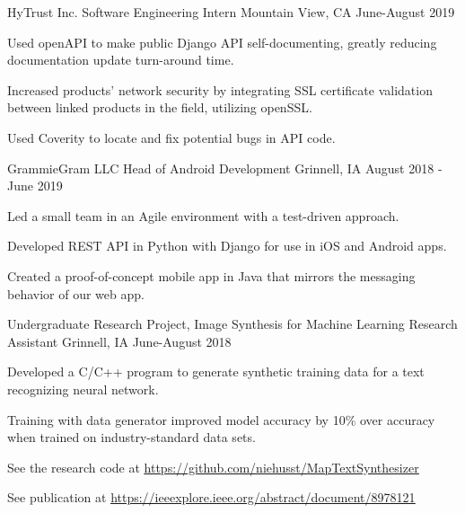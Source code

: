 \documentclass[12pt, a4paper]{awesome-cv}
\begin{document}
\begin{cventries}
  \cventry
    {HyTrust Inc.}
    {Software Engineering Intern}
    {Mountain View, CA}
    {June-August 2019}
    {
      \begin{cvitems}
      	  \item {Used openAPI to make public Django API self-documenting, greatly reducing documentation update turn-around time.}
	      \item {Increased products' network security by integrating SSL certificate validation between linked products in the field, utilizing openSSL.}
	      \item {Used Coverity to locate and fix potential bugs in API code.}
      \end{cvitems}
    }

  \cventry
    {GrammieGram LLC}
    {Head of Android Development}
    {Grinnell, IA}
    {August 2018 - June 2019}
    {
      \begin{cvitems}
        \item {Led a small team in an Agile environment with a test-driven approach.}
      	\item {Developed REST API in Python with Django for use in iOS and Android apps.}
	      \item {Created a proof-of-concept mobile app in Java that mirrors the messaging behavior of our web app.}
      \end{cvitems}
    }


  \cventry
    {Undergraduate Research Project, Image Synthesis for Machine Learning}
    {Research Assistant}
    {Grinnell, IA}
    {June-August 2018}
    {
      \begin{cvitems}
        \item{Developed a C/C++ program to generate synthetic training data for a text recognizing neural network.}
        \item{Training with data generator improved model accuracy by 10\% over accuracy when trained on industry-standard data sets.}
	    \item{See the research code at \underline{\href{https://github.com/niehusst/MapTextSynthesizer}{https://github.com/niehusst/MapTextSynthesizer}}}
	    \item{See publication at \underline{\href{https://ieeexplore.ieee.org/abstract/document/8978121}{https://ieeexplore.ieee.org/abstract/document/8978121}}}
      \end{cvitems}
    }



\end{cventries}
\end{document}
